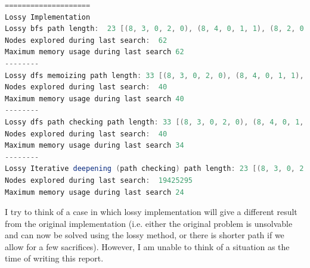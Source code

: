 \documentclass[9.5pt]{extarticle}
\begin{document}
\begin{lstlisting}[language=java,caption={Output for lossy algorithm for start state of (8,5,0,0,1) and E = 0}]
====================
Lossy Implementation
Lossy bfs path length:  23 [(8, 3, 0, 2, 0), (8, 4, 0, 1, 1), (8, 2, 0, 3, 0), (8, 3, 0, 2, 1), (6, 3, 2, 2, 0), (6, 4, 2, 1, 1), (5, 3, 3, 2, 0), (5, 4, 3, 1, 1), (5, 2, 3, 3, 0), (5, 3, 3, 2, 1), (4, 2, 4, 3, 0), (4, 3, 4, 2, 1), (4, 1, 4, 4, 0), (4, 2, 4, 3, 1), (3, 1, 5, 4, 0), (3, 2, 5, 3, 1), (3, 0, 5, 5, 0), (3, 1, 5, 4, 1), (2, 0, 6, 5, 0), (2, 1, 6, 4, 1), (1, 0, 7, 5, 0), (1, 1, 7, 4, 1), (0, 0, 8, 5, 0)]
Nodes explored during last search:  62
Maximum memory usage during last search 62
--------
Lossy dfs memoizing path length: 33 [(8, 3, 0, 2, 0), (8, 4, 0, 1, 1), (8, 2, 0, 3, 0), (8, 3, 0, 2, 1), (6, 3, 2, 2, 0), (6, 4, 2, 1, 1), (5, 4, 3, 1, 0), (5, 5, 3, 0, 1), (5, 3, 3, 2, 0), (5, 4, 3, 1, 1), (5, 2, 3, 3, 0), (5, 3, 3, 2, 1), (4, 3, 4, 2, 0), (4, 4, 4, 1, 1), (4, 2, 4, 3, 0), (4, 3, 4, 2, 1), (4, 1, 4, 4, 0), (4, 2, 4, 3, 1), (3, 2, 5, 3, 0), (3, 3, 5, 2, 1), (3, 1, 5, 4, 0), (3, 2, 5, 3, 1), (3, 0, 5, 5, 0), (3, 1, 5, 4, 1), (2, 1, 6, 4, 0), (2, 2, 6, 3, 1), (2, 0, 6, 5, 0), (2, 1, 6, 4, 1), (1, 0, 7, 5, 0), (1, 1, 7, 4, 1), (0, 1, 8, 4, 0), (0, 2, 8, 3, 1), (0, 0, 8, 5, 0)]
Nodes explored during last search:  40
Maximum memory usage during last search 40
--------
Lossy dfs path checking path length: 33 [(8, 3, 0, 2, 0), (8, 4, 0, 1, 1), (8, 2, 0, 3, 0), (8, 3, 0, 2, 1), (6, 3, 2, 2, 0), (6, 4, 2, 1, 1), (5, 4, 3, 1, 0), (5, 5, 3, 0, 1), (5, 3, 3, 2, 0), (5, 4, 3, 1, 1), (5, 2, 3, 3, 0), (5, 3, 3, 2, 1), (4, 3, 4, 2, 0), (4, 4, 4, 1, 1), (4, 2, 4, 3, 0), (4, 3, 4, 2, 1), (4, 1, 4, 4, 0), (4, 2, 4, 3, 1), (3, 2, 5, 3, 0), (3, 3, 5, 2, 1), (3, 1, 5, 4, 0), (3, 2, 5, 3, 1), (3, 0, 5, 5, 0), (3, 1, 5, 4, 1), (2, 1, 6, 4, 0), (2, 2, 6, 3, 1), (2, 0, 6, 5, 0), (2, 1, 6, 4, 1), (1, 0, 7, 5, 0), (1, 1, 7, 4, 1), (0, 1, 8, 4, 0), (0, 2, 8, 3, 1), (0, 0, 8, 5, 0)]
Nodes explored during last search:  40
Maximum memory usage during last search 34
--------
Lossy Iterative deepening (path checking) path length: 23 [(8, 3, 0, 2, 0), (8, 4, 0, 1, 1), (8, 2, 0, 3, 0), (8, 3, 0, 2, 1), (6, 3, 2, 2, 0), (6, 4, 2, 1, 1), (5, 3, 3, 2, 0), (5, 4, 3, 1, 1), (5, 2, 3, 3, 0), (5, 3, 3, 2, 1), (4, 2, 4, 3, 0), (4, 3, 4, 2, 1), (4, 1, 4, 4, 0), (4, 2, 4, 3, 1), (3, 1, 5, 4, 0), (3, 2, 5, 3, 1), (3, 0, 5, 5, 0), (3, 1, 5, 4, 1), (2, 0, 6, 5, 0), (2, 1, 6, 4, 1), (1, 0, 7, 5, 0), (1, 1, 7, 4, 1), (0, 0, 8, 5, 0)]
Nodes explored during last search:  19425295
Maximum memory usage during last search 24
\end{lstlisting}

I try to think of a case in which lossy implementation will give a different result from the original implementation (i.e. either the original problem is unsolvable and can now be solved using the lossy method, or there is shorter path if we allow for a few sacrifices). However, I am unable to think of a situation as the time of writing this report.\\
\end{document}
